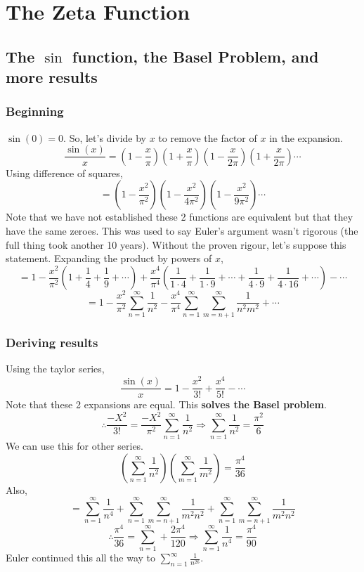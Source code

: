 \documentclass[../main.tex]{subfiles}
\begin{document}
\chapter{The Zeta Function}

\section{The $\sin$ function, the Basel Problem, and more results}
    \subsection{Beginning}
        $\sin(0)=0$. So, let's divide by $x$ to remove the factor of $x$ in the expansion.
        $$\frac{\sin(x)}{x}=(1-\frac{x}{\pi})(1+\frac{x}{\pi})(1-\frac{x}{2\pi})(1+\frac{x}{2\pi})\cdots$$
        Using difference of squares,
        $$=(1-\frac{x^{2}}{\pi^{2}})(1-\frac{x^{2}}{4\pi^{2}})(1-\frac{x^{2}}{9\pi^{2}})\cdots$$
        Note that we have not established these 2 functions are equivalent but that they have the same zeroes. This was used to say Euler's argument wasn't
        rigorous (the full thing took another 10 years). Without the proven rigour, let's suppose this statement.
        Expanding the product by powers of $x$,
        $$=1-\frac{x^{2}}{\pi^{2}}(1+\frac{1}{4}+\frac{1}{9}+\cdots)+\frac{x^{4}}{\pi^{4}}(\frac{1}{1\cdot 4}+\frac{1}{1\cdot 9} + \cdots + \frac{1}{4 \cdot 9} + \frac{1}{4 \cdot 16}+\cdots)-\cdots$$
        $$=1-\frac{x^{2}}{\pi^{2}}\sum_{n=1}^{\infty}\frac{1}{n^{2}}-\frac{x^{4}}{\pi^{4}}\sum_{n=1}^{\infty}\sum_{m=n+1}^{\infty}\frac{1}{n^{2}m^{2}}+\cdots$$
 
    \subsection{Deriving results}
        Using the taylor series,
        $$\frac{\sin(x)}{x}=1-\frac{x^{2}}{3!}+\frac{x^{4}}{5!}-\cdots$$
        Note that these 2 expansions are equal. This \textbf{solves the Basel problem}.
        $$\therefore \frac{-X^{2}}{3!}=\frac{-X^{2}}{\pi^{2}}\sum_{n=1}^{\infty}\frac{1}{n^{2}}\Rightarrow \sum_{n=1}^{\infty}\frac{1}{n^{2}}=\frac{\pi^{2}}{6}$$
        We can use this for other series.
        $$\left(\sum_{n=1}^{\infty}\frac{1}{n^{2}}\right)\left(\sum_{m=1}^{\infty}\frac{1}{m^{2}}\right)=\frac{\pi^{4}}{36}$$
        Also,
        $$=\sum_{n=1}^{\infty}\frac{1}{n^{4}}+\sum_{n=1}^{\infty}\sum_{m=n+1}^{\infty}\frac{1}{m^{2}n^{2}}+\sum_{n=1}^{\infty}\sum_{m=n+1}^{\infty}\frac{1}{m^{2}n^{2}}$$
        $$\therefore \frac{\pi^{4}}{36}=\sum_{n=1}^{\infty}+\frac{2\pi^{4}}{120}\Rightarrow \sum_{n=1}^{\infty}\frac{1}{n^{4}}=\frac{\pi^{4}}{90}$$
        Euler continued this all the way to $\sum_{n=1}^{\infty}\frac{1}{n^{26}}$.
\end{document}
